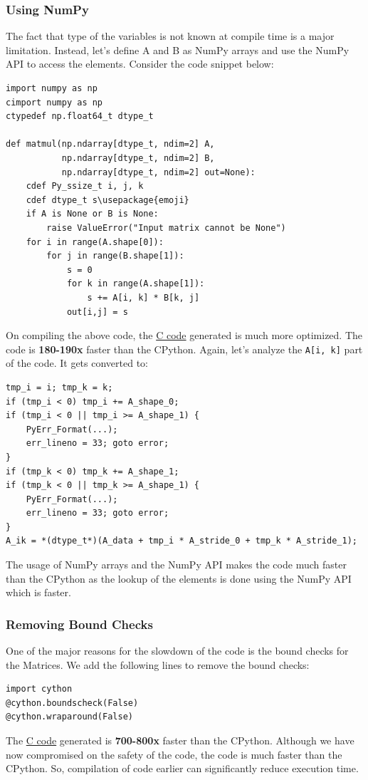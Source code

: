 \documentclass[11pt,paper=a4,answers]{exam}
\begin{document}
\subsubsection{Using NumPy}
The fact that type of the variables is not known at compile time is a major limitation. Instead, let's define A and B as NumPy arrays and use the NumPy API to access the elements. Consider the code snippet below:
\begin{lstlisting}[style=pythonStyle]
import numpy as np
cimport numpy as np
ctypedef np.float64_t dtype_t

def matmul(np.ndarray[dtype_t, ndim=2] A,
           np.ndarray[dtype_t, ndim=2] B,
           np.ndarray[dtype_t, ndim=2] out=None):
    cdef Py_ssize_t i, j, k
    cdef dtype_t s\usepackage{emoji}
    if A is None or B is None:
        raise ValueError("Input matrix cannot be None")
    for i in range(A.shape[0]):
        for j in range(B.shape[1]):
            s = 0
            for k in range(A.shape[1]):
                s += A[i, k] * B[k, j]
            out[i,j] = s
\end{lstlisting}
On compiling the above code, the \href{https://pastebin.com/28jYiVf2}{C code} generated is much more optimized. The code is \textbf{180-190x} faster than the CPython. Again, let's analyze the \texttt{A[i, k]} part of the code. It gets converted to:
\begin{lstlisting}[style=cStyle]
tmp_i = i; tmp_k = k;
if (tmp_i < 0) tmp_i += A_shape_0;
if (tmp_i < 0 || tmp_i >= A_shape_1) {
    PyErr_Format(...);
    err_lineno = 33; goto error;
}
if (tmp_k < 0) tmp_k += A_shape_1;
if (tmp_k < 0 || tmp_k >= A_shape_1) {
    PyErr_Format(...);
    err_lineno = 33; goto error;
}
A_ik = *(dtype_t*)(A_data + tmp_i * A_stride_0 + tmp_k * A_stride_1);
\end{lstlisting}
The usage of NumPy arrays and the NumPy API makes the code much faster than the CPython as the lookup of the elements is done using the NumPy API which is faster.
\subsubsection{Removing Bound Checks}
One of the major reasons for the slowdown of the code is the bound checks for the Matrices. We add the following lines to remove the bound checks:
\begin{lstlisting}[style=pythonStyle]
import cython
@cython.boundscheck(False)
@cython.wraparound(False)
\end{lstlisting}
The \href{https://pastebin.com/emJDYFkM}{C code} generated is \textbf{700-800x} faster than the CPython. Although we have now compromised on the safety of the code, the code is much faster than the CPython. So, compilation of code earlier can significantly reduce execution time.
\end{document}
